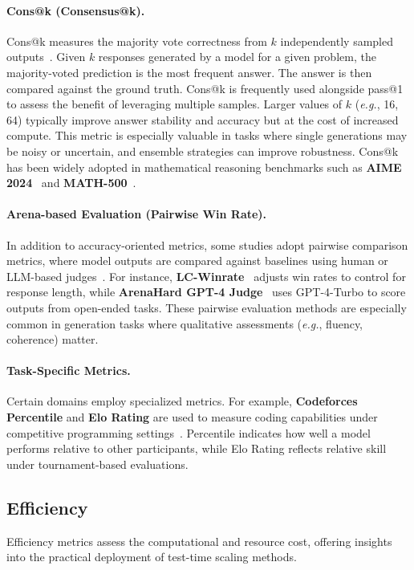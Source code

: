 \paragraph{Cons@k (Consensus@k).}
Cons@k measures the majority vote correctness from $k$ independently sampled outputs~\citep{deepseek-r1, zeng2025revisiting}. Given $k$ responses generated by a model for a given problem, the majority-voted prediction is the most frequent answer. The answer is then compared against the ground truth. 
Cons@k is frequently used alongside pass@1 to assess the benefit of leveraging multiple samples. 
Larger values of $k$ (\emph{e.g.}, 16, 64) typically improve answer stability and accuracy but at the cost of increased compute.
This metric is especially valuable in tasks where single generations may be noisy or uncertain, and ensemble strategies can improve robustness. Cons@k has been widely adopted in mathematical reasoning benchmarks such as \textbf{AIME 2024}~\citep{aime25} and \textbf{MATH-500}~\citep{zhang2024rest}.

\paragraph{Arena-based Evaluation (Pairwise Win Rate).}
In addition to accuracy-oriented metrics, some studies adopt pairwise comparison metrics, where model outputs are compared against baselines using human or LLM-based judges~\citep{deepseek-r1, hou2025advancing}.
For instance, \textbf{LC-Winrate}~\citep{dubois2024lengthcontrolledalpacaevalsimpleway} adjusts win rates to control for response length, while \textbf{ArenaHard GPT-4 Judge}~\citep{li2024crowdsourceddatahighqualitybenchmarks} uses GPT-4-Turbo to score outputs from open-ended tasks.
These pairwise evaluation methods are especially common in generation tasks where qualitative assessments (\emph{e.g.}, fluency, coherence) matter.

\paragraph{Task-Specific Metrics.}
Certain domains employ specialized metrics. For example, \textbf{Codeforces} \textbf{Percentile} and \textbf{Elo Rating} are used to measure coding capabilities under competitive programming settings~\citep{deepseek-r1, kimi-k1.5}.
Percentile indicates how well a model performs relative to other participants, while Elo Rating reflects relative skill under tournament-based evaluations.


\subsection{Efficiency}
\label{subsec:efficiency}
Efficiency metrics assess the computational and resource cost, offering insights into the practical deployment of test-time scaling methods.

